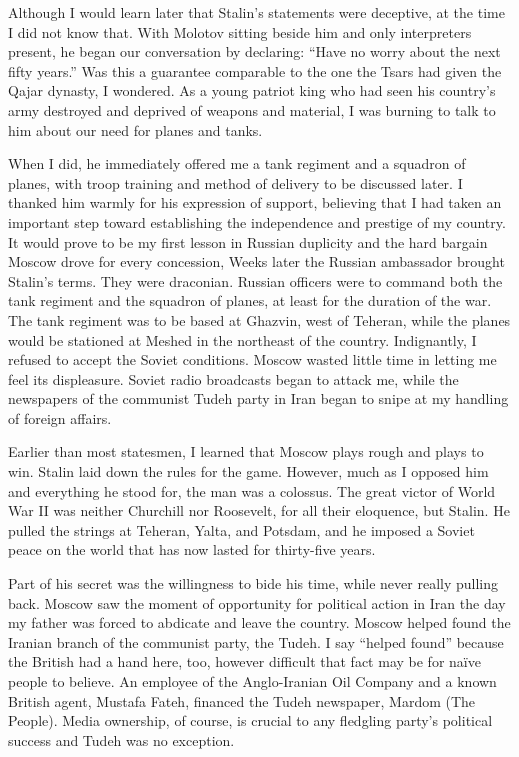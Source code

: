 Although I would learn later that Stalin's statements were deceptive, at the time I did not know that. With Molotov sitting beside him and only interpreters present, he began our conversation by declaring: “Have no worry about the next fifty years.” Was this a guarantee comparable to the one the Tsars had given the Qajar dynasty, I wondered. As a young patriot king who had seen his country's army destroyed and deprived of weapons and material, I was burning to talk to him about our need for planes and tanks. 


When I did, he immediately offered me a tank regiment and a squadron of planes, with troop training and method of delivery to be discussed later. I thanked him warmly for his expression of support, believing that I had taken an important step toward establishing the independence and prestige of my country. It would prove to be my first lesson in Russian duplicity and the hard bargain Moscow drove for every concession, Weeks later the Russian ambassador brought Stalin's terms. They were draconian. Russian officers were to command both the tank regiment and the squadron of planes, at least for the duration of the war. The tank regiment was to be based at Ghazvin, west of Teheran, while the planes would be stationed at Meshed in the northeast of the country. Indignantly, I refused to accept the Soviet conditions. Moscow wasted little time in letting me feel its displeasure. Soviet radio broadcasts began to attack me, while the newspapers of the communist Tudeh party in Iran began to snipe at my handling of foreign affairs. 

Earlier than most statesmen, I learned that Moscow plays rough and plays to win. Stalin laid down the rules for the game. However, much as I opposed him and everything he stood for, the man was a colossus. The great victor of World War II was neither Churchill nor Roosevelt, for all their eloquence, but Stalin. He pulled the strings at Teheran, Yalta, and Potsdam, and he imposed a Soviet peace on the world that has now lasted for thirty-five years. 

Part of his secret was the willingness to bide his time, while never really pulling back. Moscow saw the moment of opportunity for political action in Iran the day my father was forced to abdicate and leave the country. Moscow helped found the Iranian branch of the communist party, the Tudeh. I say “helped found” because the British had a hand here, too, however difficult that fact may be for naïve people to believe. An employee of the Anglo-Iranian Oil Company and a known British agent, Mustafa Fateh, financed the Tudeh newspaper, Mardom (The People). Media ownership, of course, is crucial to any fledgling party’s political success and Tudeh was no exception. 

